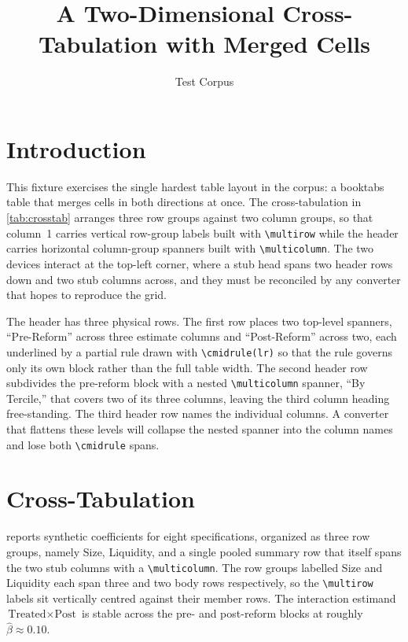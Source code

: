 \documentclass[11pt]{article}
\title{A Two-Dimensional Cross-Tabulation with Merged Cells}
\author{Test Corpus}
\date{}
\begin{document}
\maketitle

\section{Introduction}
\label{sec:intro}

This fixture exercises the single hardest table layout in the corpus: a booktabs
table that merges cells in both directions at once. The cross-tabulation in
\cref{tab:crosstab} arranges three row groups against two column groups, so that
column~1 carries vertical row-group labels built with \verb|\multirow| while the
header carries horizontal column-group spanners built with \verb|\multicolumn|.
The two devices interact at the top-left corner, where a stub head spans two
header rows down and two stub columns across, and they must be reconciled by any
converter that hopes to reproduce the grid.

The header has three physical rows. The first row places two top-level spanners,
``Pre-Reform'' across three estimate columns and ``Post-Reform'' across two, each
underlined by a partial rule drawn with \verb|\cmidrule(lr)| so that the rule
governs only its own block rather than the full table width. The second header
row subdivides the pre-reform block with a nested \verb|\multicolumn| spanner,
``By Tercile,'' that covers two of its three columns, leaving the third column
heading free-standing. The third header row names the individual columns. A
converter that flattens these levels will collapse the nested spanner into the
column names and lose both \verb|\cmidrule| spans.

\section{Cross-Tabulation}
\label{sec:crosstab}

 reports synthetic coefficients for eight specifications,
organized as three row groups, namely Size, Liquidity, and a single pooled
summary row that itself spans the two stub columns with a \verb|\multicolumn|.
The row groups labelled Size and Liquidity each span three and two body rows
respectively, so the \verb|\multirow| labels sit vertically centred against
their member rows. The interaction estimand
$\text{Treated}\times\text{Post}$ is stable across the pre- and post-reform
blocks at roughly $\widehat{\beta}\approx 0.10$.
\end{document}
